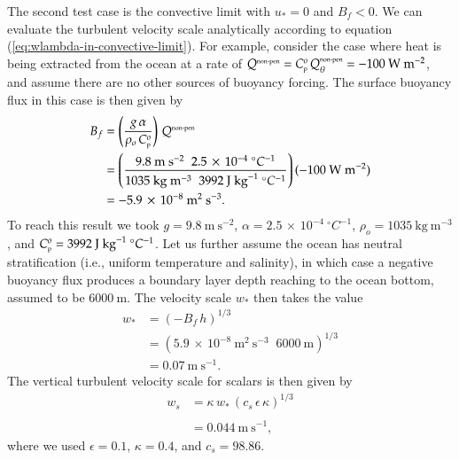 The second test case is the convective limit with $u_{*}=0$ and $B_{f}
< 0$.  We can evaluate the turbulent velocity scale analytically
according to equation (\ref{eq:wlambda-in-convective-limit}).  For
example, consider the case where heat is being extracted from the
ocean at a rate of $Q^{\mbox{\tiny non-pen}} = C_{\mbox{\tiny p}}^{o}
\, Q_{\theta}^{\mbox{\tiny non-pen}}= -100~\mbox{W}~\mbox{m}^{-2}$,
and assume there are no other sources of buoyancy forcing.  The
surface buoyancy flux in this case is then given by
\begin{subequations}
\begin{align}
 B_{f} &= \left( \frac{g \, \alpha}{\rho_{o} \, C_{\mbox{\tiny p}}^{o} } \right) \, Q^{\mbox{\tiny non-pen}} 
\\
 &= \left( \frac{ 9.8~\mbox{m}~\mbox{s}^{-2} \; \; 2.5 \, \times \, 10^{-4}~\mbox{}^{\circ}C^{-1} }
             {1035~\mbox{kg}~\mbox{m}^{-3} \; \; 3992~\mbox{J}~\mbox{kg}^{-1}~\mbox{}^{\circ}C^{-1} }
       \right)
       (-100~\mbox{W}~\mbox{m}^{-2})
 \\
 &= -5.9 \, \times \, 10^{-8}~\mbox{m}^{2}~\mbox{s}^{-3}.
\end{align}
\end{subequations}
To reach this result we took $g = 9.8~\mbox{m}~\mbox{s}^{-2}$, $\alpha
= 2.5 \, \times \, 10^{-4}~\mbox{}^{\circ}C^{-1}$, $\rho_{o} =
1035~\mbox{kg}~\mbox{m}^{-3}$, and $C_{\mbox{\tiny p}}^{o} =
3992~\mbox{J}~\mbox{kg}^{-1}~\mbox{}^{\circ}C^{-1}$.  Let us further
assume the ocean has neutral stratification (i.e., uniform temperature
and salinity), in which case a negative buoyancy flux produces a
boundary layer depth reaching to the ocean bottom, assumed to be
$6000~\mbox{m}$.  The velocity scale $w_{*}$ then takes the value 
\begin{subequations}
\begin{align}
  w_{*} &= (-B_{f} \, h)^{1/3}
 \\
  &= (5.9 \, \times \, 10^{-8}~\mbox{m}^{2}~\mbox{s}^{-3} \; \; 6000~\mbox{m})^{1/3} 
 \\
 &= 0.07~\mbox{m}~\mbox{s}^{-1}.
\end{align}
\end{subequations}
The vertical turbulent velocity scale for scalars is then given by 
\begin{subequations}
\begin{align}
 w_{s} &= \kappa \, w_{*} \, (c_{s} \, \epsilon \, \kappa)^{1/3}  
 \\
 \\ &= 
  0.044~\mbox{m}~\mbox{s}^{-1},
\end{align}
\end{subequations}
 where we used $\epsilon=0.1$, $\kappa=0.4$, and $c_{s} = 98.86$.  



